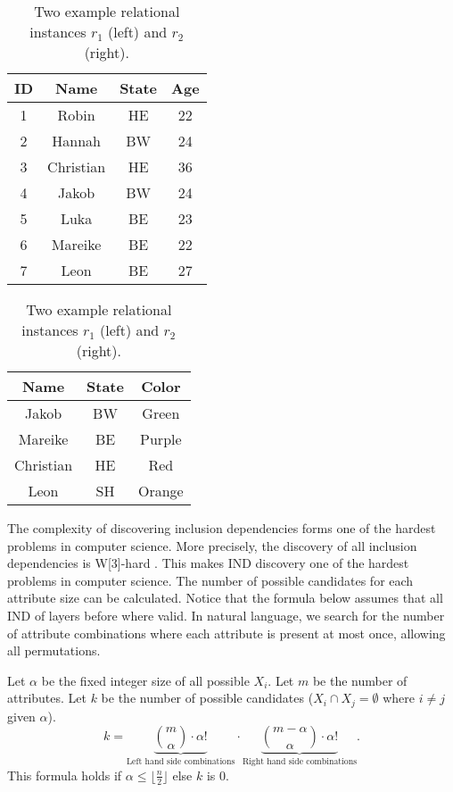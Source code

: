 \begin{table}[]
    \centering
    \begin{tabular}{c|c|c|c}
        ID & Name & State & Age \\
        \hline
        1 & Robin & HE & 22 \\
        2 & Hannah & BW & 24 \\
        3 & Christian & HE & 36 \\
        4 & Jakob & BW & 24 \\
        5 & Luka & BE & 23 \\
        6 & Mareike & BE & 22 \\
        7 & Leon & BE & 27 \\
    \end{tabular}
    \begin{tabular}{c|c|c}
        Name & State & Color \\
        \hline
        Jakob & BW & Green \\
        Mareike & BE & Purple \\
        Christian & HE & Red \\
        Leon & SH & Orange \\
    \end{tabular}
    \caption{Two example relational instances $r_1$ (left) and $r_2$ (right).}
    \label{tab:relExamp}
\end{table}

\noindent The complexity of discovering inclusion dependencies forms one of the hardest problems in computer science. More precisely, the discovery of all inclusion dependencies is W[3]-hard \cite{blasius2017parameterized}. This makes IND discovery one of the hardest problems in computer science. The number of possible candidates for each attribute size can be calculated. Notice that the formula below assumes that all IND of layers before where valid. In natural language, we search for the number of attribute combinations where each attribute is present at most once, allowing all permutations.

\begin{definition}\label{def:candidates}
    Let $\alpha$ be the fixed integer size of all possible $X_i$. Let $m$ be the number of attributes. Let $k$ be the number of possible candidates ($X_i \cap X_j = \emptyset$ where $i \not = j$ given $\alpha$).
    \[
        k = \underbrace{\binom{m}{\alpha}\cdot \alpha ! }_{\text{Left hand side combinations}} \cdot \underbrace{\binom{m-\alpha}{\alpha}\cdot \alpha!}_\text{Right hand side combinations}.
    \]
    This formula holds if $\alpha \leq \lfloor \frac{n}{2} \rfloor$ else $k$ is $0$.
\end{definition}


